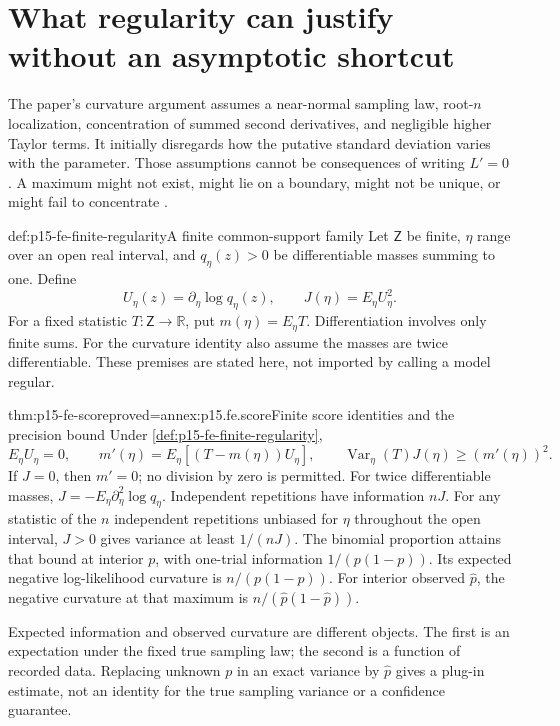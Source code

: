 \section{What regularity can justify without an asymptotic shortcut}

The paper's curvature argument assumes a near-normal sampling law,
root-\(n\) localization, concentration of summed second derivatives,
and negligible higher Taylor terms. It initially disregards how the
putative standard deviation varies with the parameter. Those assumptions
cannot be consequences of writing \(L'=0\). A maximum might not exist,
might lie on a boundary, might not be unique, or might fail to concentrate
\cite[pp.~328--332]{Fisher1922Foundations}.

\begin{hbdefinition}{def:p15-fe-finite-regularity}{A finite common-support family}
Let \(\mathsf Z\) be finite, \(\eta\) range over an open real
interval, and \(q_\eta(z)>0\) be differentiable masses summing to one.
Define
\[
 U_\eta(z)=\partial_\eta\log q_\eta(z),\qquad
 J(\eta)=E_\eta U_\eta^2.
\]
For a fixed statistic \(T:\mathsf Z\to\mathbb R\), put
\(m(\eta)=E_\eta T\). Differentiation involves only finite sums.
For the curvature identity also assume the masses are twice differentiable.
These premises are stated here, not imported by calling a model regular.
\end{hbdefinition}

\begin{hbtheorem}{thm:p15-fe-score}{proved=annex:p15.fe.score}{Finite score identities and the precision bound}
Under \cref{def:p15-fe-finite-regularity},
\[
 E_\eta U_\eta=0,\qquad
 m'(\eta)=E_\eta[(T-m(\eta))U_\eta],\qquad
 \operatorname{Var}_\eta(T)J(\eta)\geq(m'(\eta))^2.
\]
If \(J=0\), then \(m'=0\); no division by zero is permitted.
For twice differentiable masses,
\(J=-E_\eta\partial_\eta^2\log q_\eta\).
Independent repetitions have information \(nJ\).
For any statistic of the \(n\) independent repetitions unbiased for
\(\eta\) throughout the open interval,
\(J>0\) gives variance at least \(1/(nJ)\).
The binomial proportion attains that bound at interior \(p\), with
one-trial information \(1/(p(1-p))\).
Its expected negative log-likelihood curvature is \(n/(p(1-p))\).
For interior observed \(\widehat p\), the negative curvature at that
maximum is \(n/(\widehat p(1-\widehat p))\).
\end{hbtheorem}

Expected information and observed curvature are different objects.
The first is an expectation under the fixed true sampling law; the
second is a function of recorded data. Replacing unknown \(p\) in
an exact variance by \(\widehat p\) gives a plug-in estimate, not
an identity for the true sampling variance or a confidence guarantee.

